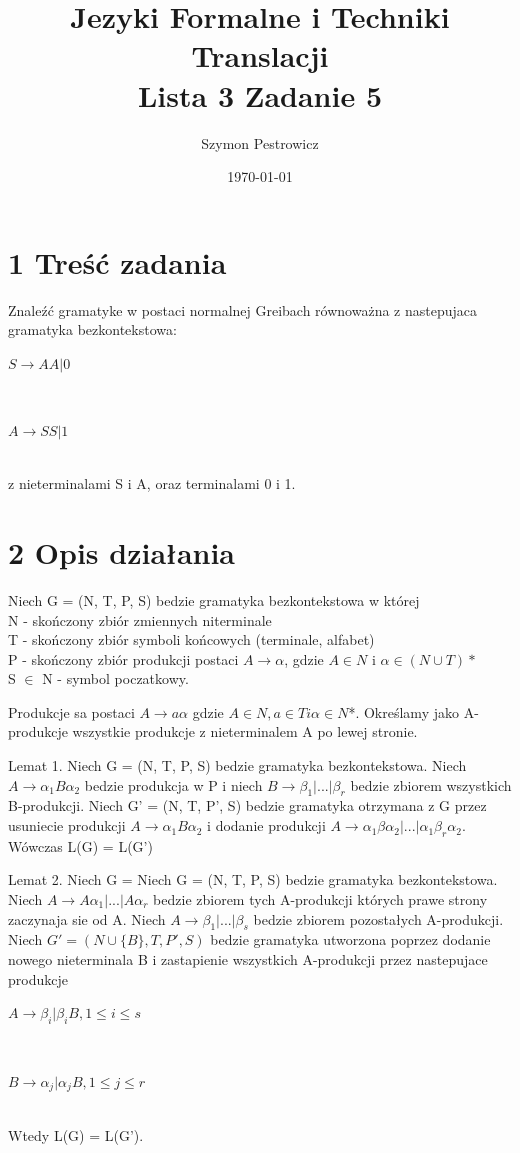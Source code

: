 \documentclass{article} %
\title{Jezyki Formalne i Techniki Translacji\\Lista 3 Zadanie 5} %
\author{Szymon Pestrowicz} %
\date{\today} %
\begin{document}
	\maketitle %

	\section*{1 Treść zadania} %
	
	Znaleźć gramatyke w postaci normalnej Greibach równoważna z nastepujaca gramatyka bezkontekstowa: \\ \centerline{$S \rightarrow AA|0$} \\ \centerline{$A \rightarrow SS|1$} \\ z nieterminalami S i A, oraz terminalami 0 i 1.

	\section*{2 Opis działania}

	Niech G = (N, T, P, S) bedzie gramatyka bezkontekstowa w której \\ N - skończony zbiór zmiennych niterminale \\ T - skończony zbiór symboli końcowych (terminale, alfabet) \\ P - skończony zbiór produkcji postaci $A\rightarrow \alpha$, gdzie $A\in N$ i $\alpha \in (N\cup T)*$ \\ S $\in$ N - symbol poczatkowy. \vspace{0.5cm}

	 Produkcje sa postaci $A\rightarrow a\alpha $ gdzie $A\in N, a\in T i \alpha \in N$*. Określamy jako A-produkcje wszystkie produkcje z nieterminalem A po lewej stronie. \vspace{0.5cm}

	Lemat 1. Niech G = (N, T, P, S) bedzie gramatyka bezkontekstowa. Niech $A\rightarrow \alpha_1B\alpha_2$ bedzie produkcja w P i niech $B \rightarrow \beta_1 |...| \beta_r$ bedzie zbiorem wszystkich B-produkcji. Niech G' = (N, T, P', S) bedzie gramatyka otrzymana z G przez usuniecie produkcji $A\rightarrow \alpha_1B\alpha_2$ i dodanie produkcji $A\rightarrow \alpha_1\beta\alpha_2|...|\alpha_1\beta_r\alpha_2$. Wówczas L(G) = L(G') \vspace{0.5cm}

	Lemat 2. Niech G = Niech G = (N, T, P, S) bedzie gramatyka bezkontekstowa. Niech $A\rightarrow A\alpha_1|...|A\alpha_r$ bedzie zbiorem tych A-produkcji których prawe strony zaczynaja sie od A. Niech $A\rightarrow\beta_1|...|\beta_s$ bedzie zbiorem pozostałych A-produkcji. Niech $G' = (N\cup \{B\}, T, P', S)$ bedzie gramatyka utworzona poprzez dodanie nowego nieterminala B i zastapienie wszystkich A-produkcji przez nastepujace produkcje\\ \centerline{$A\rightarrow \beta_i|\beta_iB, 1 \leq i \leq s$} \\ \centerline{$B\rightarrow \alpha_j|\alpha_jB, 1 \leq j \leq r$} \\ Wtedy L(G) = L(G').
\end{document}
